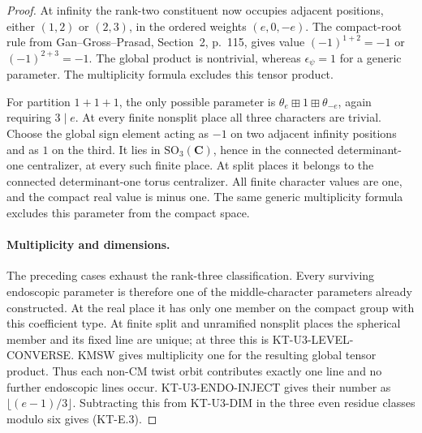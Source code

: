 \begin{proof}
At infinity the rank-two constituent now occupies adjacent
positions, either $(1,2)$ or $(2,3)$, in the ordered weights
$(e,0,-e)$. The compact-root rule from Gan--Gross--Prasad,
Section~2, p.~115, gives value $(-1)^{1+2}=-1$ or
$(-1)^{2+3}=-1$. The global product is nontrivial, whereas
$\epsilon_\psi=1$ for a generic parameter. The multiplicity
formula excludes this tensor product.

For partition $1+1+1$, the only possible parameter is
$\theta_e\boxplus1\boxplus\theta_{-e}$, again requiring
$3\mid e$. At every finite nonsplit place all three characters
are trivial. Choose the global sign element acting as $-1$ on
two adjacent infinity positions and as $1$ on the third.
It lies in $\mathrm{SO}_3(\mathbf C)$, hence in the connected
determinant-one centralizer, at every such finite place. At
split places it belongs to the connected determinant-one torus
centralizer. All finite character values are one, and the
compact real value is minus one. The same generic multiplicity
formula excludes this parameter from the compact space.

\paragraph{Multiplicity and dimensions.}
The preceding cases exhaust the rank-three classification.
Every surviving endoscopic parameter is therefore one of the
middle-character parameters already constructed. At the real
place it has only one member on the compact group with this
coefficient type. At finite split and unramified nonsplit places
the spherical member and its fixed line are unique; at three
this is KT-U3-LEVEL-CONVERSE. KMSW gives multiplicity one for
the resulting global tensor product. Thus each non-CM twist
orbit contributes exactly one line and no further endoscopic
lines occur. KT-U3-ENDO-INJECT gives their number as
$\lfloor(e-1)/3\rfloor$. Subtracting this from KT-U3-DIM in
the three even residue classes modulo six gives (KT-E.3).
\end{proof}

